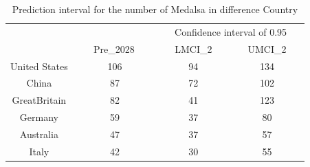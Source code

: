 \documentclass{mcmthesis}
\begin{document}
\begin{table}
\centering
\caption{Prediction interval for the number of Medalsa in difference Country}
\begin{tabular}{|c|ccc|} 
\hhline{|----|}
\rowcolor[rgb]{1,0.482,0} \multicolumn{1}{|c}{{\cellcolor[rgb]{1,0.482,0}}}                                      & {\cellcolor[rgb]{1,0.482,0}}                                    & \multicolumn{2}{c|}{~ ~Confidence interval of 0.95~ ~}                             \\
\rowcolor[rgb]{1,0.482,0} \multicolumn{1}{|c}{\multirow{-2}{*}{{\cellcolor[rgb]{1,0.482,0}}~ ~ ~ Country~ ~ ~~}} & \multirow{-2}{*}{{\cellcolor[rgb]{1,0.482,0}}~ ~ Pre\_2028~ ~~} & {\cellcolor[rgb]{1,0.824,0.635}}LMCI\_2 & {\cellcolor[rgb]{1,0.824,0.635}}UMCI\_2  \\ 
\hline
{\cellcolor[rgb]{0.992,0.737,0.529}}United States                                                                & 106                                                             & 94                                      & 134                                      \\ 
\hline
\rowcolor[rgb]{1,0.824,0.635} {\cellcolor[rgb]{0.992,0.737,0.529}}China                                          & 87                                                              & 72                                      & 102                                      \\ 
\hline
{\cellcolor[rgb]{0.992,0.737,0.529}}GreatBritain                                                                 & 82                                                              & 41                                      & 123                                      \\ 
\hline
\rowcolor[rgb]{1,0.824,0.635} {\cellcolor[rgb]{0.992,0.737,0.529}}Germany                                        & 59                                                              & 37                                      & 80                                       \\ 
\hline
{\cellcolor[rgb]{0.992,0.737,0.529}}Australia                                                                    & 47                                                              & 37                                      & 57                                       \\ 
\hline
\rowcolor[rgb]{1,0.824,0.635} {\cellcolor[rgb]{0.992,0.737,0.529}}Italy                                          & 42                                                              & 30                                      & 55                                       \\ 

\end{tabular}
\end{table}
\end{document}
